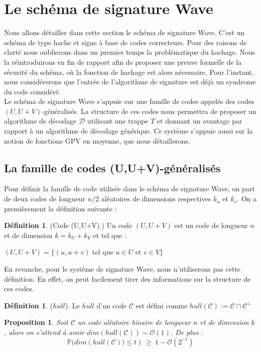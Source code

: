 \documentclass[12pt]{article}
\theoremstyle{plain}
\newtheorem{propo}[thm]{Proposition}
\theoremstyle{definition}
\newtheorem{defi}[thm]{Définition}
\begin{document}
\section{Le schéma de signature Wave}
Nous allons détailler dans cette section le schéma de signature Wave. C'est un schéma de type hache et signe à base de codes correcteurs. Pour des raisons de clarté nous oublierons dans un premier temps la problématique du hachage. Nous la réintroduirons en fin de rapport afin de proposer une preuve formelle de la sécurité du schéma, où la fonction de hachage est alors nécessaire. Pour l'instant, nous considérerons que l'entrée de l'algorithme de signature est déjà un syndrome du code considéré.\\
Le schéma de signature Wave s'appuie sur une famille de codes appelés des codes $(U,U+V)$-généralisés. La structure de ces codes nous permettra de proposer un algorithme de décodage $\mathcal{D}$ utilisant une trappe $T$ et donnant un avantage par rapport à un algorithme de décodage générique. Ce système s'appuie aussi sur la notion de fonctions GPV en moyenne, que nous détaillerons.

\subsection{La famille de codes (U,U+V)-généralisés}
Pour définir la famille de code utilisée dans le schéma de signature Wave, on part de deux codes de longueur $n/2$ aléatoires de dimensions respectives $k_u$ et $k_v$. On a premièrement la définition suivante :

\begin{defi}\label{UV} (Code (U,U+V).) Un code $(U,U+V)$ est un code de longueur $n$ et de dimension $k=k_U+k_V$ et tel que :
\begin{center}
$(U,U+V) = \{(u,u+v)$ tel que $u \in U$ et $v \in V \}$
\end{center}
\end{defi}


\noindent En revanche, pour le système de signature Wave, nous n'utiliserons pas cette définition. En effet, on peut facilement tirer des informations sur la structure de ces codes.\\


\begin{defi}($hull$).
Le  $hull$ d'un code $\mathcal{C}$ est défini comme $hull(\mathcal{C}) := \mathcal{C} \cap \mathcal{C}^{\bot}$
\end{defi}

\begin{propo}\label{dim_hull}
Soit $\mathcal{C}$ un code aléatoire binaire de longueur $n$ et de dimension $k$, alors on s'attend à avoir $dim(hull(\mathcal{C}))\sim\mathcal{O}(1)$. De plus : $$ \mathbb{P}\big(dim(hull(\mathcal{C})\big) \leq t) \ \geq\ 1 - \mathcal{O}(2^{-t}) $$
\end{propo}
\end{document}
